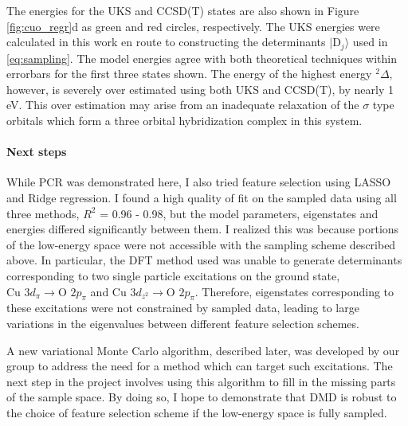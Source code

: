 \documentclass[12pt]{article}
\begin{document}
The energies for the UKS and CCSD(T) \cite{Xian2000} states are also shown in Figure \ref{fig:cuo_regr}d as green and red circles, respectively.
The UKS energies were calculated in this work en route to constructing the determinants $|\text{D}_j\rangle$ used in \eqref{eq:sampling}.
The model energies agree with both theoretical techniques within errorbars for the first three states shown.
The energy of the highest energy $^2\Delta$, however, is severely over estimated using both UKS and CCSD(T), by nearly 1 eV.
This over estimation may arise from an inadequate relaxation of the $\sigma$ type orbitals which form a three orbital hybridization complex in this system.

\vspace{-10pt}
\paragraph{Next steps}
While PCR was demonstrated here, I also tried feature selection using LASSO and Ridge regression. 
I found a high quality of fit on the sampled data using all three methods, $R^2$ = 0.96 - 0.98, but the model parameters, eigenstates and energies differed significantly between them.
I realized this was because portions of the low-energy space were not accessible with the sampling scheme described above.
In particular, the DFT method used was unable to generate determinants corresponding to two single particle excitations on the ground state, $\text{Cu } 3d_\pi \rightarrow \text{O } 2p_\pi$ and $\text{Cu } 3d_{z^2} \rightarrow \text{O } 2p_\pi$.
Therefore, eigenstates corresponding to these excitations were not constrained by sampled data, leading to large variations in the eigenvalues between different feature selection schemes.

A new variational Monte Carlo algorithm, described later, was developed by our group to address the need for a method which can target such excitations.
The next step in the project involves using this algorithm to fill in the missing parts of the sample space.
By doing so, I hope to demonstrate that DMD is robust to the choice of feature selection scheme if the low-energy space is fully sampled.
\end{document}
